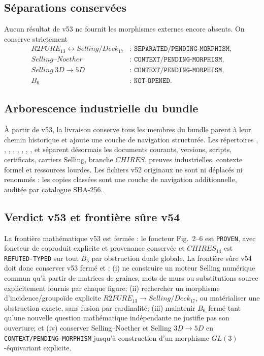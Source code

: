 \subsection{Séparations conservées}

Aucun résultat de v53 ne fournit les morphismes externes encore absents. On conserve strictement
\[
 \boxed{
 \begin{aligned}
 R2PURE_{13}\leftrightarrow Selling/Deck_{17}
   &:\ \texttt{SEPARATED/PENDING-MORPHISM},\\
 Selling\text{--}Noether
   &:\ \texttt{CONTEXT/PENDING-MORPHISM},\\
 Selling\ 3D\to5D
   &:\ \texttt{CONTEXT/PENDING-MORPHISM},\\
 B_6&:\ \texttt{NOT-OPENED}.
 \end{aligned}}
\]

\subsection{Arborescence industrielle du bundle}

À partir de v53, la livraison conserve tous les membres du bundle parent à leur chemin historique et ajoute une couche de navigation structurée. Les répertoires , , , , , , , ,  et  séparent désormais les documents courants, versions, scripts, certificats, carriers Selling, branche $CHIRES$, preuves industrielles, contexte formel et ressources lourdes. Les fichiers v52 originaux ne sont ni déplacés ni renommés : les copies classées sont une couche de navigation additionnelle, auditée par catalogue SHA-256.

\subsection{Verdict v53 et frontière sûre v54}

La frontière mathématique v53 est fermée : le foncteur Fig.~2--6 est \texttt{PROVEN}, avec foncteur de coproduit explicite et provenance conservée et $CHIRES_{14}$ est \texttt{REFUTED-TYPED} sur tout $B_5$ par obstruction duale globale. La frontière sûre v54 doit donc conserver v53 fermé et : (i) ne construire un moteur Selling numérique commun qu'à partir de matrices de graines, mots de murs ou substitutions source explicitement fournis par chaque figure; (ii) rechercher un morphisme d'incidence/groupoïde explicite $R2PURE_{13}\to Selling/Deck_{17}$, ou matérialiser une obstruction exacte, sans fusion par cardinalité; (iii) maintenir $B_6$ fermé tant qu'une nouvelle question mathématique indépendante ne justifie pas son ouverture; et (iv) conserver Selling--Noether et Selling $3D\to5D$ en \texttt{CONTEXT/PENDING-MORPHISM} jusqu'à construction d'un morphisme $GL(3)$-équivariant explicite.
